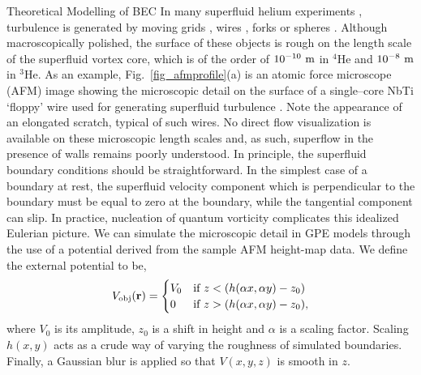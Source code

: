 \begin{chapter}{\label{cha:theoretical_model}Theoretical Modelling of BEC}
In many superfluid helium experiments \cite{VinenSkrbek2008}, turbulence
is generated by moving grids \cite{Davis2000},
wires \cite{Guenault1986,brad05,Bradley2011,Fisher2001,goto08},
forks \cite{Blaauwgeers2007,Bradley2012} or spheres \cite{Schoepe1995}.
Although macroscopically polished, the surface of these objects is
rough on the length scale of the superfluid vortex core, which is of
the order of $10^{-10}~\rm m$ in $^4$He
and $10^{-8}~\rm m$ in $^3$He.  As an example, Fig.~\ref{fig_afmprofile}(a) is an atomic force microscope (AFM) image showing the microscopic detail on the surface of a  single--core NbTi `floppy' wire used for generating superfluid turbulence  \cite{Bradley2011}.  Note the appearance of an elongated scratch, typical of such wires.  No direct flow visualization is available on these microscopic length scales and, as such, 
superflow in the presence of walls remains poorly understood. In principle, the superfluid boundary conditions should
be straightforward.
In the simplest case of a boundary at rest, the superfluid velocity
component which is perpendicular to the boundary must be equal to
zero at the boundary, while the tangential component can slip.
In practice, nucleation of quantum vorticity complicates
this idealized Eulerian picture. We can simulate the microscopic detail in GPE models through the use of a potential derived from the sample AFM height-map data. We define the external potential to be,
\begin{equation}
V_{\mathrm{obj}}({\bf r}) =
\begin{cases}
V_0 &\mbox{if } z < (h(\alpha x,\alpha y)-z_0)  \\
0 &\mbox{if } z > (h(\alpha x,\alpha y)-z_0),
\end{cases}
\label{eq:potentialAFM3D}
\end{equation}
where $V_0$ is its amplitude, $z_0$ is a shift in height and $\alpha$ is a scaling factor. Scaling $h(x,y)$ acts as a crude way of varying 
the roughness of simulated boundaries. Finally, a Gaussian blur is applied so that $V(x,y,z)$ is smooth in $z$.


\end{chapter}
